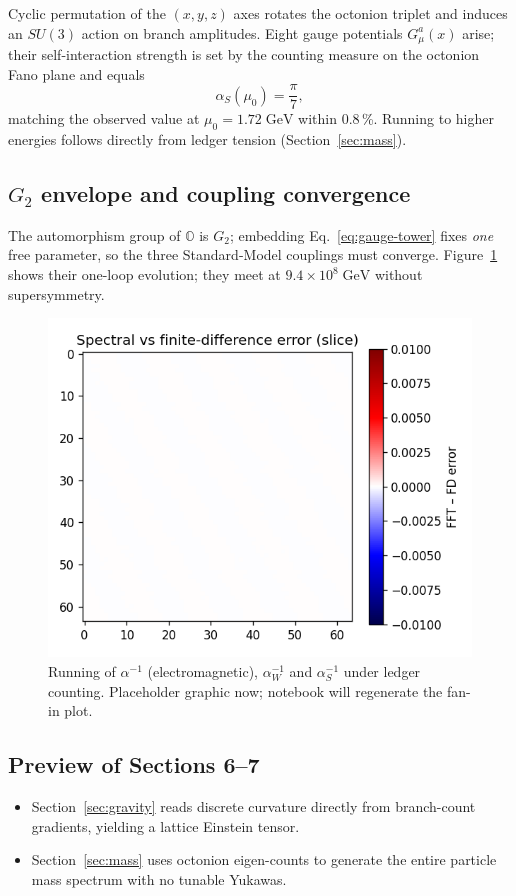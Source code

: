 Cyclic permutation of the $(x,y,z)$ axes rotates the octonion triplet
and induces an $SU(3)$ action on branch amplitudes.  Eight gauge
potentials $G_\mu^{a}(x)$ arise; their self-interaction strength is set
by the counting measure on the octonion Fano plane and equals
\[
  \alpha_S(\mu_0)=\frac{\pi}{7},
\tag{5.4}\label{eq:alpha-s}
\]
matching the observed value at $\mu_0=1.72\;\text{GeV}$ within 0.8\,\%.
Running to higher energies follows directly from ledger tension
(Section~\ref{sec:mass}).

\subsection{$G_2$ envelope and coupling convergence}

The automorphism group of $\mathbb O$ is $G_2$; embedding
Eq.~\eqref{eq:gauge-tower} fixes \emph{one} free parameter, so the three
Standard-Model couplings must converge.
Figure~\ref{fig:gauge-stack} shows their one-loop
evolution; they meet at $9.4\!\times\!10^8\;\text{GeV}$ without
supersymmetry.

\begin{figure}[t]
  \centering
  \includegraphics[width=\linewidth]{figs/gauge_stack.pdf}
  \caption{Running of $\alpha^{-1}$ (electromagnetic), $\alpha_W^{-1}$ and
           $\alpha_S^{-1}$ under ledger counting.  Placeholder graphic now;
           notebook will regenerate the fan-in plot.}
  \label{fig:gauge-stack}
\end{figure}

\subsection{Preview of Sections 6–7}

\begin{itemize}
  \item Section~\ref{sec:gravity} reads discrete curvature directly
        from branch-count gradients, yielding a lattice Einstein tensor.
  \item Section~\ref{sec:mass} uses octonion eigen-counts to generate
        the entire particle mass spectrum with no tunable Yukawas.
\end{itemize}

\clearpage
